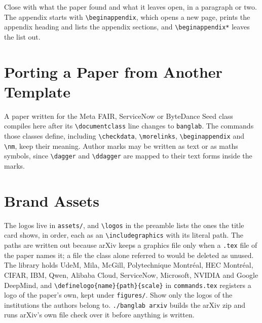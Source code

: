 \documentclass{banglab}
\begin{document}
Close with what the paper found and what it leaves open, in a paragraph or two.
The appendix starts with \verb|\beginappendix|, which opens a new page, prints the appendix heading and lists the appendix sections, and \verb|\beginappendix*| leaves the list out.




\beginappendix
\section{Porting a Paper from Another Template}
\label{app:porting}

A paper written for the Meta FAIR, ServiceNow or ByteDance Seed class compiles here after its \verb|\documentclass| line changes to \texttt{banglab}.
The commands those classes define, including \verb|\checkdata|, \verb|\morelinks|, \verb|\beginappendix| and \verb|\nm|, keep their meaning.
Author marks may be written as text or as maths symbols, since \verb|\dagger| and \verb|\ddagger| are mapped to their text forms inside the marks.

\section{Brand Assets}
\label{app:brand-assets}

The logos live in \texttt{assets/}, and \verb|\logos| in the preamble lists the ones the title card shows, in order, each as an \verb|\includegraphics| with its literal path.
The paths are written out because arXiv keeps a graphics file only when a \texttt{.tex} file of the paper names it; a file the class alone referred to would be deleted as unused.
The library holds UdeM, Mila, McGill, Polytechnique Montréal, HEC Montréal, CIFAR, IBM, Qwen, Alibaba Cloud, ServiceNow, Microsoft, NVIDIA and Google DeepMind, and \verb|\definelogo{name}{path}{scale}| in \texttt{commands.tex} registers a logo of the paper's own, kept under \texttt{figures/}.
Show only the logos of the institutions the authors belong to.
\verb|./banglab arxiv| builds the arXiv zip and runs arXiv's own file check over it before anything is written.
\end{document}
